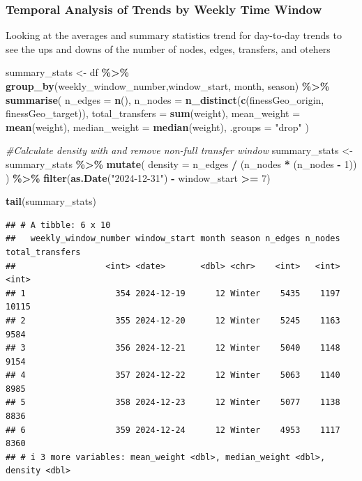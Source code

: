 \documentclass[
]{article}
\newenvironment{Shaded}{\begin{snugshade}}{\end{snugshade}}
\newcommand{\AttributeTok}[1]{\textcolor[rgb]{0.13,0.29,0.53}{#1}}
\newcommand{\CommentTok}[1]{\textcolor[rgb]{0.56,0.35,0.01}{\textit{#1}}}
\newcommand{\DecValTok}[1]{\textcolor[rgb]{0.00,0.00,0.81}{#1}}
\newcommand{\FunctionTok}[1]{\textcolor[rgb]{0.13,0.29,0.53}{\textbf{#1}}}
\newcommand{\NormalTok}[1]{#1}
\newcommand{\OtherTok}[1]{\textcolor[rgb]{0.56,0.35,0.01}{#1}}
\newcommand{\SpecialCharTok}[1]{\textcolor[rgb]{0.81,0.36,0.00}{\textbf{#1}}}
\newcommand{\StringTok}[1]{\textcolor[rgb]{0.31,0.60,0.02}{#1}}
\begin{document}
\subsubsection{Temporal Analysis of Trends by Weekly Time
Window}\label{temporal-analysis-of-trends-by-weekly-time-window}

Looking at the averages and summary statistics trend for day-to-day
trends to see the ups and downs of the number of nodes, edges,
transfers, and otehers

\begin{Shaded}
\begin{Highlighting}[]
\NormalTok{summary\_stats }\OtherTok{\textless{}{-}}\NormalTok{ df }\SpecialCharTok{\%\textgreater{}\%}
  \FunctionTok{group\_by}\NormalTok{(weekly\_window\_number,window\_start,  month, season) }\SpecialCharTok{\%\textgreater{}\%}
  \FunctionTok{summarise}\NormalTok{(}
    \AttributeTok{n\_edges =} \FunctionTok{n}\NormalTok{(),}
    \AttributeTok{n\_nodes =} \FunctionTok{n\_distinct}\NormalTok{(}\FunctionTok{c}\NormalTok{(finessGeo\_origin, finessGeo\_target)),}
    \AttributeTok{total\_transfers =} \FunctionTok{sum}\NormalTok{(weight),}
    \AttributeTok{mean\_weight =} \FunctionTok{mean}\NormalTok{(weight),}
    \AttributeTok{median\_weight =} \FunctionTok{median}\NormalTok{(weight),}
    \AttributeTok{.groups =} \StringTok{"drop"}
\NormalTok{  )}

\CommentTok{\#Calculate density with and remove non{-}full transfer window}
\NormalTok{summary\_stats }\OtherTok{\textless{}{-}}\NormalTok{ summary\_stats }\SpecialCharTok{\%\textgreater{}\%}
  \FunctionTok{mutate}\NormalTok{(}
    \AttributeTok{density =}\NormalTok{ n\_edges }\SpecialCharTok{/}\NormalTok{ (n\_nodes }\SpecialCharTok{*}\NormalTok{ (n\_nodes }\SpecialCharTok{{-}} \DecValTok{1}\NormalTok{))}
\NormalTok{  ) }\SpecialCharTok{\%\textgreater{}\%} 
  \FunctionTok{filter}\NormalTok{(}\FunctionTok{as.Date}\NormalTok{(}\StringTok{"2024{-}12{-}31"}\NormalTok{) }\SpecialCharTok{{-}}\NormalTok{ window\_start }\SpecialCharTok{\textgreater{}=} \DecValTok{7}\NormalTok{)}

\FunctionTok{tail}\NormalTok{(summary\_stats)}
\end{Highlighting}
\end{Shaded}

\begin{verbatim}
## # A tibble: 6 x 10
##   weekly_window_number window_start month season n_edges n_nodes total_transfers
##                  <int> <date>       <dbl> <chr>    <int>   <int>           <int>
## 1                  354 2024-12-19      12 Winter    5435    1197           10115
## 2                  355 2024-12-20      12 Winter    5245    1163            9584
## 3                  356 2024-12-21      12 Winter    5040    1148            9154
## 4                  357 2024-12-22      12 Winter    5063    1140            8985
## 5                  358 2024-12-23      12 Winter    5077    1138            8836
## 6                  359 2024-12-24      12 Winter    4953    1117            8360
## # i 3 more variables: mean_weight <dbl>, median_weight <dbl>, density <dbl>
\end{verbatim}
\end{document}
